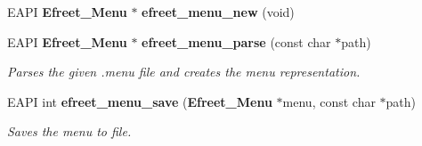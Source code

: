 \begin{CompactItemize}
EAPI {\bf Efreet\_\-Menu} $\ast$ {\bf efreet\_\-menu\_\-new} (void)
\item 
EAPI {\bf Efreet\_\-Menu} $\ast$ {\bf efreet\_\-menu\_\-parse} (const char $\ast$path)
\begin{CompactList}\small\item\em Parses the given .menu file and creates the menu representation. \item\end{CompactList}\item 
EAPI int {\bf efreet\_\-menu\_\-save} ({\bf Efreet\_\-Menu} $\ast$menu, const char $\ast$path)
\begin{CompactList}\small\item\em Saves the menu to file. \item\end{CompactList}\end{CompactItemize}
